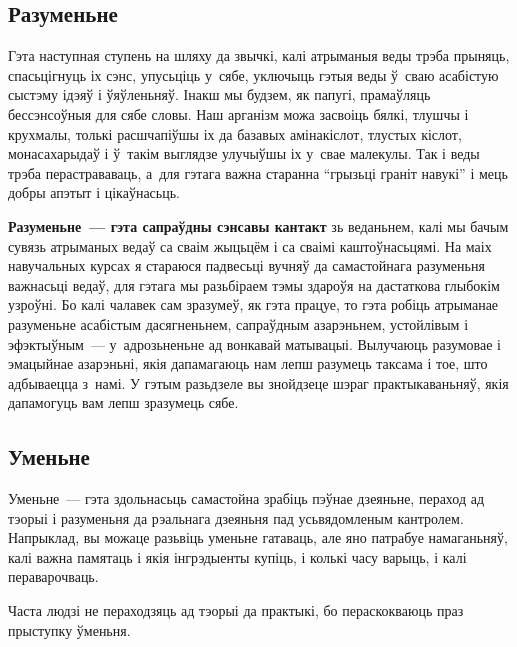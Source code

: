 \subsection*{Разуменьне}

Гэта наступная ступень на шляху да звычкі, калі атрыманыя веды трэба прыняць, спасьцігнуць іх сэнс, упусьціць у~сябе, уключыць гэтыя веды ў~сваю асабістую сыстэму ідэяў і ўяўленьняў. Інакш мы будзем, як папугі, прамаўляць бессэнсоўныя для сябе словы. Наш арганізм можа засвоіць бялкі, тлушчы і крухмалы, толькі расшчапіўшы іх да базавых амінакіслот, тлустых кіслот, монасахарыдаў і ў~такім выглядзе улучыўшы іх у~свае малекулы. Так і веды трэба перастрававаць, а~для гэтага важна старанна ``грызьці граніт навукі'' і мець добры апэтыт і цікаўнасьць.

\textbf{Разуменьне~--- гэта сапраўдны сэнсавы кантакт} зь веданьнем, калі мы бачым сувязь атрыманых ведаў са сваім жыцьцём і са сваімі каштоўнасьцямі. На маіх навучальных курсах я стараюся падвесьці вучняў да самастойнага разуменьня важнасьці ведаў, для гэтага мы разьбіраем тэмы здароўя на дастаткова глыбокім узроўні. Бо калі чалавек сам зразумеў, як гэта працуе, то гэта робіць атрыманае разуменьне асабістым дасягненьнем, сапраўдным азарэньнем, устойлівым і эфэктыўным~--- у~адрозьненьне ад вонкавай матывацыі. Вылучаюць разумовае і эмацыйнае азарэньні, якія дапамагаюць нам лепш разумець таксама і тое, што адбываецца з~намі. У гэтым разьдзеле вы знойдзеце шэраг практыкаваньняў, якія дапамогуць вам лепш зразумець сябе.

\subsection*{Уменьне}

Уменьне~--- гэта здольнасьць самастойна зрабіць пэўнае дзеяньне, пераход ад тэорыі і разуменьня да рэальнага дзеяньня пад усьвядомленым кантролем. Напрыклад, вы можаце разьвіць уменьне гатаваць, але яно патрабуе намаганьняў, калі важна памятаць і якія інгрэдыенты купіць, і колькі часу варыць, і калі пераварочваць.

Часта людзі не пераходзяць ад тэорыі да практыкі, бо пераскокваюць праз прыступку ўменьня.


